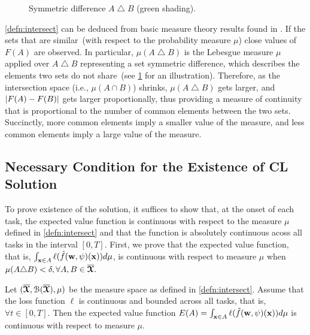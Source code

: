 \begin{figure}
    \centering
    \vspace{-10pt}
    \vspace{-5pt}
    \caption{Symmetric difference $A\bigtriangleup B$ (green shading).}
    \label{fig:setsim}
\end{figure}
\cref{defn:intersect} can be deduced from basic measure 
theory results found in \cite{weaver2013measure}. If the
sets that are similar~(with respect to the probability measure $\mu$) 
close values of $F(A)$ are observed. In particular, $\mu(A\bigtriangleup B)$ is the Lebesgue measure $\mu$
applied over $A\bigtriangleup B$ representing a set 
symmetric difference, which describes the elements 
two sets do not share~(see \cref{fig:setsim} 
for an illustration). Therefore, as the intersection space (i.e., $\mu(A\cap B)$) shrinks, $\mu(A\bigtriangleup B)$ gets larger, and $\lvert F(A)-F(B) \rvert$ gets larger proportionally, thus providing a measure of continuity 
that is proportional to the number of common elements between the two sets. Succinctly, more common elements imply a smaller value of the measure, and less common elements imply a large value of the measure. 


\subsection{Necessary Condition for the Existence of CL Solution}
To prove existence of the solution, it suffices to show that, at the onset of each task, the expected value function is continuous with respect to the measure $\mu$ defined in \cref{defn:intersect} and that the function is absolutely continuous acoss all tasks in the interval $[0,T].$ First, we prove that the expected value function, that is, $\int_{\boldsymbol{\mathrm{x}}\in A}
       \ell(\hat{f}(\boldsymbol{\mathrm{w}},\psi
       )( \boldsymbol{\mathrm{x}} ) )d\mu$, is continuous with respect to measure $\mu$ when $\mu(A\triangle B)<\delta, \forall A, B \in \overline{\boldsymbol{\mathcal{X}}}.$ 
\begin{lemma}\label{lem:contMeasure}
    Let $(\overline{\boldsymbol{\mathcal{X}}},\mathcal{B}(\overline{\boldsymbol{\mathcal{X}}}), \mu)$ be the measure space as 
    defined in \cref{defn:intersect}. 
    Assume that the loss function $\ell$ is continuous 
    and bounded across all tasks, that is, $\forall t \in [0,T].$ 
    Then the expected value function $  E(A) = \int_{\boldsymbol{\mathrm{x}}\in A}
       \ell(\hat{f}(\boldsymbol{\mathrm{w}},\psi)( \boldsymbol{\mathrm{x}} ) )d\mu$ is continuous with respect to measure $\mu$.
\end{lemma}

